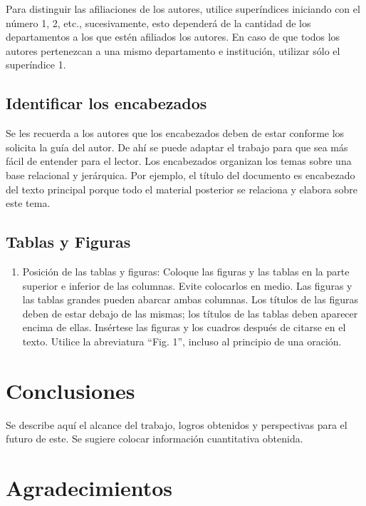Para distinguir las afiliaciones de los autores, utilice superíndices iniciando con el número 1, 2, etc., sucesivamente, esto dependerá de la cantidad de los departamentos a los que estén afiliados los autores. En caso de que todos los autores pertenezcan a una mismo departamento e institución, utilizar sólo el superíndice 1. 

\subsection{Identificar los encabezados}

Se les recuerda a los autores que los encabezados deben de estar conforme los solicita la guía del autor. De ahí se puede adaptar el trabajo para que sea más fácil de entender para el lector.
Los encabezados organizan los temas sobre una base relacional y jerárquica. Por ejemplo, el título del documento es encabezado del texto principal porque todo el material posterior se relaciona y elabora sobre este tema. 

\subsection{Tablas y Figuras}

\begin{enumerate}
    \item Posición de las tablas y figuras: Coloque las figuras y las tablas en la parte superior e inferior de las columnas. Evite colocarlos en medio. Las figuras y las tablas grandes pueden abarcar ambas columnas. Los títulos de las figuras deben de estar debajo de las mismas; los títulos de las tablas deben aparecer encima de ellas. Insértese las figuras y los cuadros después de citarse en el texto. Utilice la abreviatura “Fig. 1”, incluso al principio de una oración. 
\end{enumerate}

\section{Conclusiones}

Se describe aquí el alcance del trabajo, logros obtenidos y perspectivas para el futuro de este. Se sugiere colocar información cuantitativa obtenida.

\section{Agradecimientos}

